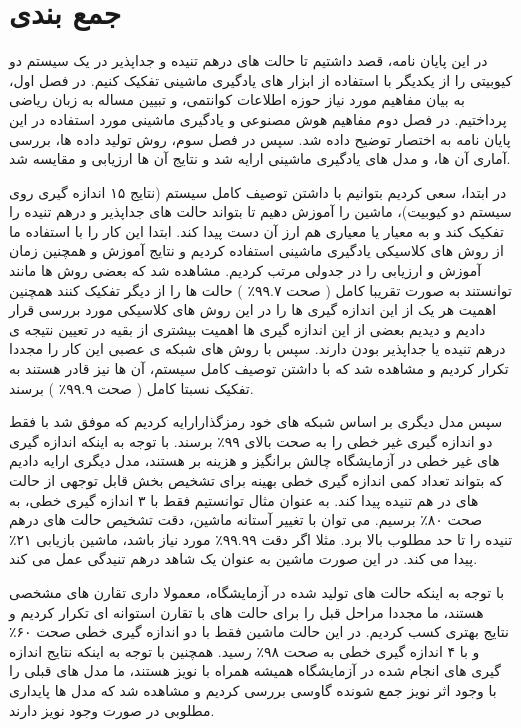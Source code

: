 \section{جمع بندی}
در این پایان نامه، قصد داشتیم تا حالت های درهم تنیده و جداپذیر در یک سیستم دو کیوبیتی را از یکدیگر با استفاده از ابزار های یادگیری ماشینی تفکیک کنیم. در فصل اول، به بیان مفاهیم مورد نیاز حوزه اطلاعات کوانتمی، و تبیین مساله به زبان ریاضی پرداختیم. در فصل دوم مفاهیم هوش مصنوعی و یادگیری ماشینی مورد استفاده در این پایان نامه به اختصار توضیح داده شد. سپس در فصل سوم، روش تولید داده ها، بررسی آماری آن ها، و مدل های یادگیری ماشینی ارایه شد و نتایج آن ها ارزیابی و مقایسه شد.


در ابتدا، سعی کردیم بتوانیم با داشتن توصیف کامل سیستم (نتایج ۱۵ اندازه گیری روی سیستم دو کیوبیت)، ماشین را آموزش دهیم تا بتواند حالت های جداپذیر و درهم تنیده را تفکیک کند و به معیار
یا معیاری هم ارز آن دست پیدا کند.
ابتدا این کار را با استفاده ما از روش های کلاسیکی یادگیری ماشینی استفاده کردیم و نتایج آموزش و همچنین زمان آموزش و ارزیابی را در جدولی مرتب کردیم. مشاهده شد که بعضی روش ها مانند
توانستند به صورت تقریبا کامل
(
صحت
۹۹.۷٪
)
حالت ها را از دیگر تفکیک کنند
همچنین اهمیت هر یک از این اندازه گیری ها را در این روش های کلاسیکی مورد بررسی قرار دادیم و دیدیم بعضی از این اندازه گیری ها اهمیت بیشتری از بقیه در تعیین نتیجه ی درهم تنیده یا جداپذیر بودن دارند.
سپس با روش های شبکه ی عصبی این کار را مجددا تکرار کردیم و مشاهده شد که با داشتن توصیف کامل سیستم، آن ها نیز قادر هستند به تفکیک نسبتا کامل
(
صحت
۹۹.۹٪
)
برسند.


سپس مدل دیگری بر اساس شبکه های خود رمزگذارارایه کردیم که موفق شد با فقط دو اندازه گیری غیر خطی را به صحت
بالای
۹۹٪
برسند. با توجه به اینکه اندازه گیری های غیر خطی در آزمایشگاه چالش برانگیز و هزینه بر هستند، مدل دیگری ارایه دادیم که بتواند تعداد کمی اندازه گیری خطی بهینه برای تشخیص بخش قابل توجهی از حالت های در هم تنیده پیدا کند. به عنوان مثال توانستیم فقط با ۳ اندازه گیری خطی، به صحت
۸۰٪
برسیم. می توان با تغییر آستانه ماشین، دقت تشخیص حالت های درهم تنیده را تا حد مطلوب بالا برد. مثلا اگر دقت
۹۹.۹۹٪
مورد نیاز باشد، ماشین بازیابی
۲۱٪
پیدا می کند. در این صورت ماشین به عنوان یک شاهد درهم تنیدگی عمل می کند.

با توجه به اینکه حالت های تولید شده در آزمایشگاه، معمولا داری تقارن های مشخصی هستند، ما مجددا مراحل قبل را برای حالت های با تقارن استوانه ای تکرار کردیم و نتایج بهتری کسب کردیم. در این حالت ماشین فقط با دو اندازه گیری خطی صحت
۶۰٪
و با ۴ اندازه گیری خطی
به صحت
۹۸٪
رسید. همچنین با توجه به اینکه نتایج اندازه گیری های انجام شده در آزمایشگاه همیشه همراه با نویز هستند، ما مدل های قبلی را با وجود اثر نویز جمع شونده گاوسی بررسی کردیم و مشاهده شد که مدل ها پایداری مطلوبی در صورت وجود نویز دارند.

